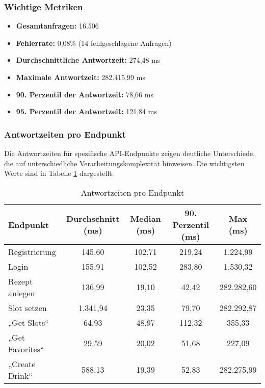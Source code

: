 \subsubsection*{Wichtige Metriken}
\begin{itemize}
    \item \textbf{Gesamtanfragen:} 16.506
    \item \textbf{Fehlerrate:} 0,08\% (14 fehlgeschlagene Anfragen)
    \item \textbf{Durchschnittliche Antwortzeit:} 274,48 ms
    \item \textbf{Maximale Antwortzeit:} 282.415,99 ms
    \item \textbf{90. Perzentil der Antwortzeit:} 78,66 ms
    \item \textbf{95. Perzentil der Antwortzeit:} 121,84 ms
\end{itemize}

\subsubsection*{Antwortzeiten pro Endpunkt}

Die Antwortzeiten für spezifische API-Endpunkte zeigen deutliche Unterschiede, die auf unterschiedliche Verarbeitungskomplexität hinweisen. Die wichtigsten Werte sind in Tabelle \ref{tab:response_times} dargestellt.

\begin{table}[h!]
    \centering
    \begin{tabular}{|l|c|c|c|c|}
        \hline
        \textbf{Endpunkt} & \textbf{Durchschnitt (ms)} & \textbf{Median (ms)} & \textbf{90. Perzentil (ms)} & \textbf{Max (ms)} \\
        \hline
        Registrierung & 145,60 & 102,71 & 219,24 & 1.224,99 \\
        Login & 155,91 & 102,52 & 283,80 & 1.530,32 \\
        Rezept anlegen & 136,99 & 19,10 & 42,42 & 282.282,60 \\
        Slot setzen & 1.341,94 & 23,35 & 79,70 & 282.292,87 \\
        „Get Slots“ & 64,93 & 48,97 & 112,32 & 355,33 \\
        „Get Favorites“ & 29,59 & 20,02 & 51,68 & 227,09 \\
        „Create Drink“ & 588,13 & 19,39 & 52,83 & 282.275,99 \\
        \hline
    \end{tabular}
    \caption{Antwortzeiten pro Endpunkt}
    \label{tab:response_times}
\end{table}

